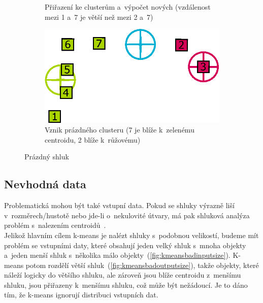 \begin{figure}[h]
\begin{subfigure}{.49\textwidth}
  \caption{Přiřazení ke clusterům a~výpočet nových (vzdálenost mezi 1 a~7 je větší než mezi 2 a~7)}
  \label{fig:kmeansemptycluster3}
\end{subfigure}
\begin{subfigure}{.49\textwidth}
  \centering
  \includegraphics[width=.9\linewidth]{img/kmeans_emptyCluster4.eps}
  \caption{Vznik prázdného clusteru (7 je blíže k~zelenému centroidu, 2 blíže k~růžovému)}
  \label{fig:kmeansemptycluster4}
\end{subfigure}
\caption{Prázdný shluk}
\label{fig:kmeansemptycluster}
\end{figure}

\subsection{Nevhodná data}
Problematická mohou být také vstupní data. Pokud se shluky výrazně liší v~rozměrech/hustotě nebo jde-li o~nekulovité útvary, má pak shluková analýza problém s~nalezením centroidů~\cite{Tan05}. \\

Jelikož hlavním cílem k-means je nalézt shluky s~podobnou velikostí, budeme mít problém se vstupními daty, které obsahují jeden velký shluk s~mnoha objekty a~jeden menší shluk s~několika málo objekty~(\autoref{fig:kmeansbadinputsize}). K-means potom rozdělí větší shluk~(\autoref{fig:kmeansbadoutputsize}), takže objekty, které náleží logicky do většího shluku, ale zároveň jsou blíže centroidu z~menšímu shluku, jsou přiřazeny k~menšímu shluku, což může být nežádoucí. Je to dáno tím, že k-means ignorují distribuci vstupních dat.

